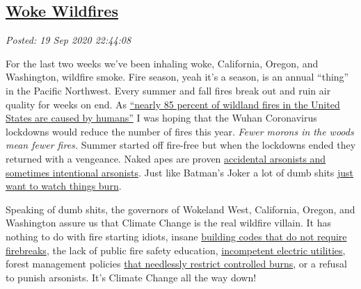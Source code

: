 %

\subsection*{\href{http://analyzethedatanotthedrivel.org/2020/09/19/woke-wildfires/}{Woke Wildfires}}


\noindent\emph{Posted: 19 Sep 2020 22:44:08}
\vspace{6pt}

For the last two weeks we've been inhaling woke, California, Oregon, and
Washington, wildfire smoke. Fire season, yeah it's a season, is an
annual ``thing'' in the Pacific Northwest. Every summer and fall fires
break out and ruin air quality for weeks on end. As
\href{https://www.nps.gov/articles/wildfire-causes-and-evaluation.htm}{``nearly
85 percent of wildland fires in the United States are caused by
humans''} I was hoping that the Wuhan Coronavirus lockdowns would reduce
the number of fires this year. \emph{Fewer morons in the woods mean
fewer fires.} Summer started off fire-free but when the lockdowns ended
they returned with a vengeance. Naked apes are proven
\href{https://www.nbcnews.com/tech/security/wildfires-rage-false-antifa-rumors-spur-pleas-police-n1239881}{accidental
arsonists and sometimes intentional arsonists}. Just like Batman's Joker
a lot of dumb shits
\href{https://www.youtube.com/watch?v=efHCdKb5UWc}{just want to watch
things burn}.

Speaking of dumb shits, the governors of Wokeland West, California,
Oregon, and Washington assure us that Climate Change is the real
wildfire villain. It has nothing to do with fire starting idiots, insane
\href{https://www.quora.com/Why-are-fire-breaks-not-established-in-California?share=1}{building
codes that do not require firebreaks}, the lack of public fire safety
education,
\href{https://www.cnn.com/2020/03/23/us/pge-guilty-camp-fire-california/index.html}{incompetent
electric utilities}, forest management policies
\href{https://www.motherjones.com/environment/2019/11/californias-wildfire-controlled-prescribed-burns-native-americans/}{that
needlessly restrict controlled burns}, or a refusal to punish arsonists.
It's Climate Change all the way down!

